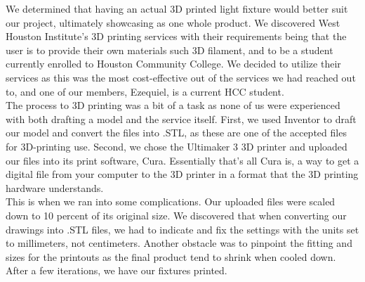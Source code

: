 \documentclass[12pt,a4paper]{report}
\begin{document}
We determined that having an actual 3D printed light fixture would better suit our project, ultimately showcasing as one whole product. We discovered West Houston Institute's 3D printing services with their requirements being that the user is to provide their own materials such 3D filament, and to be a student currently enrolled to Houston Community College. We decided to utilize their services as this was the most cost-effective out of the services we had reached out to, and one of our members, Ezequiel, is a current HCC student.\\ \linebreak
The process to 3D printing was a bit of a task as none of us were experienced with both drafting a model and the service itself. First, we used Inventor to draft our model and convert the files into .STL, as these are one of the accepted files for 3D-printing use. Second, we chose the Ultimaker 3 3D printer and uploaded our files into its print software, Cura. Essentially that's all Cura is, a way to get a digital file from your computer to the 3D printer in a format that the 3D printing hardware understands.\\ \linebreak
This is when we ran into some complications. Our uploaded files were scaled down to 10 percent of its original size. We discovered that when converting our drawings into .STL files, we had to indicate and fix the settings with the units set to millimeters, not centimeters. Another obstacle was to pinpoint the fitting and sizes for the printouts as the final product tend to shrink when cooled down. After a few iterations, we have our fixtures printed.\\ \linebreak 

\newpage
\end{document}
